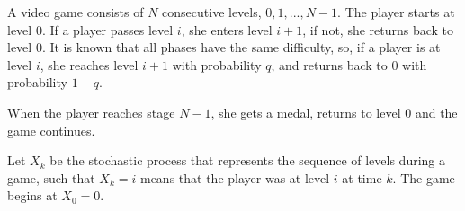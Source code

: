 \else

A video game consists of $N$ consecutive levels, $0, 1, ..., N-1$. The player starts at level 0. If a player passes level $i$, she enters level $i+1$, if not, she returns back to level 0. It is known that all phases have the same difficulty, so, if a player is at level $i$, she reaches level $i+1$ with probability $q$, and returns back to 0 with probability $1-q$. 

When the player reaches stage $N-1$, she gets a medal, returns to level 0 and the game continues.

Let $X_k$ be the stochastic process that represents the sequence of levels during a game, such that $X_k=i$ means that the player was at level $i$ at time $k$. The game begins at $X_0=0$.

